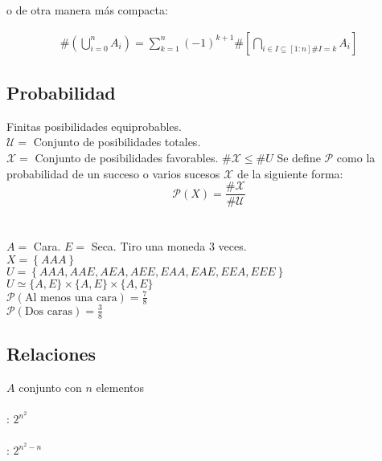 \documentclass[a4paper,10pt]{article}
\begin{document}
o de otra manera más compacta: 

\begin{equation}
   \begin{split}
  \#\left(\bigcup_{i=0}^{n} {A_i}\right) = \sum_{k=1}^{n} { { \left( -1 \right) }^{k+1} \# \left[ \bigcap_{i \in I \subseteq \left[ 1:n \right] \# I = k } {A_i} \right] }
   \end{split}
\end{equation}


\subsection{Probabilidad}


Finitas posibilidades equiprobables. \\
$\mathcal{U} = $ Conjunto de posibilidades totales. \\
$\mathcal{X} = $ Conjunto de posibilidades favorables. $\# \mathcal{X} \leq \# U$
Se define $\mathcal{P}$ como la probabilidad de un succeso o varios sucesos $\mathcal{X}$ de la siguiente forma:\\
$$ \mathcal{P}(X) = \frac{\# \mathcal{X}}{\#\mathcal{U}} $$ \\

\ejemplo \\
$A = $ Cara. $E = $ Seca.
Tiro una moneda 3 veces. \\ $X = \left\{AAA\right\}$ \\ $U = \left\{AAA,AAE,AEA,AEE,EAA,EAE,EEA,EEE\right\}$ \\ $U \simeq \{A,E\} \times \{A,E\} \times \{A,E\}$ \\ $\mathcal{P}(\mbox{Al menos una cara})=\frac{7}{8}$ \\ $\mathcal{P}(\mbox{Dos caras}) = \frac {3}{8} $


\subsection{Relaciones}

$A$ conjunto con $n$ elementos \\ \\

: $2^{n^{2}}$ \\ \\

: $2^{n^{2}-n}$ \\ \\
\end{document}
